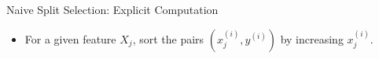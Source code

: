 \documentclass[11pt,compress,t,notes=noshow, aspectratio=169, xcolor=table]{beamer}
\begin{document}
\begin{frame}{Naive Split Selection: Explicit Computation}
\begin{itemize}
  \item For a given feature \( X_j \), sort the pairs \( (x_j^{(i)}, y^{(i)}) \) by increasing \( x_j^{(i)} \).


\end{itemize}
\end{frame}
\end{document}
